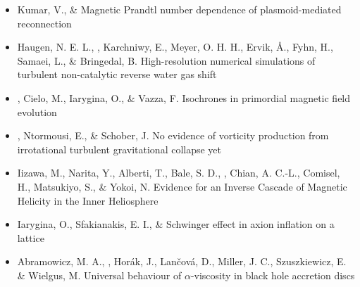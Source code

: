 \begin{itemize}

\item[{482.}~]
Kumar, V., \& \Brandenburg{}
{Magnetic Prandtl number dependence of plasmoid-mediated reconnection}

\item[{481.}~]
Haugen, N. E. L., \Brandenburg, Karchniwy, E., Meyer, O. H. H., Ervik, \AA., Fyhn, H., Samaei, L., \& Bringedal, B.
{High-resolution numerical simulations of turbulent non-catalytic reverse water gas shift}

\item[{480.}~]
\Brandenburg, Cielo, M., Iarygina, O., \& Vazza, F.
{Isochrones in primordial magnetic field evolution}

\item[{479.}~]
\Brandenburg, Ntormousi, E., \& Schober, J.
{No evidence of vorticity production from irrotational turbulent gravitational collapse yet}

\item[{478.}~]
Iizawa, M., Narita, Y., Alberti, T., Bale, S. D., \Brandenburg, Chian, A. C.-L., Comisel, H., Matsukiyo, S., \& Yokoi, N.
{Evidence for an Inverse Cascade of Magnetic Helicity in the Inner Heliosphere}

\item[{477.}~]
Iarygina, O., Sfakianakis, E. I., \& \Brandenburg{}
{Schwinger effect in axion inflation on a lattice}

\item[{476.}~]
Abramowicz, M. A., \Brandenburg, Hor{\'a}k, J., Lan\v{c}ov\'a, D., Miller, J. C., Szuszkiewicz, E. \& Wielgus, M.
{Universal behaviour of $\alpha$-viscosity in black hole accretion discs}


\end{itemize}
